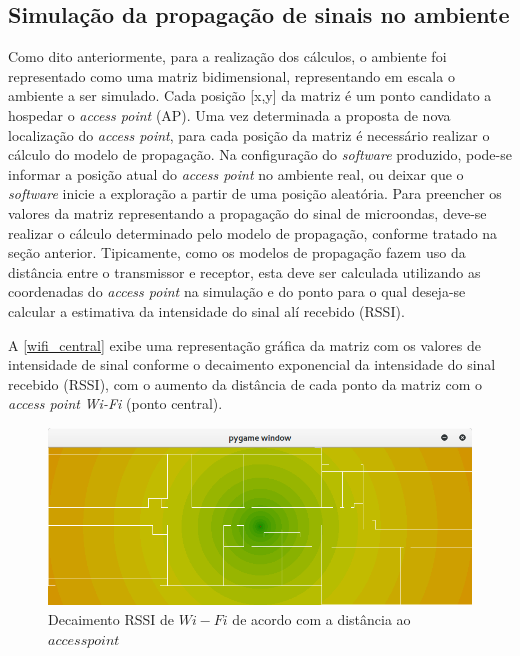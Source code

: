 \documentclass[
	12pt,				%
	twoside,			%
	a4paper,			%
	english,			%
	french,				%
	spanish,			%
	brazil				%
	]{abntex2}
\begin{document}
\subsection{Simulação da propagação de sinais no
ambiente}\label{simulauxe7uxe3o-da-propagauxe7uxe3o-de-sinais-no-ambiente}

Como dito anteriormente, para a realização dos cálculos, o ambiente foi
representado como uma matriz bidimensional, representando em escala o
ambiente a ser simulado. Cada posição {[}x,y{]} da matriz é um ponto
candidato a hospedar o \emph{access point} (AP). Uma vez determinada a
proposta de nova localização do \emph{access point}, para cada posição
da matriz é necessário realizar o cálculo do modelo de propagação. Na
configuração do \emph{software} produzido, pode-se informar a posição
atual do \emph{access point} no ambiente real, ou deixar que o
\emph{software} inicie a exploração a partir de uma posição aleatória.
Para preencher os valores da matriz representando a propagação do sinal
de microondas, deve-se realizar o cálculo determinado pelo modelo de
propagação, conforme tratado na seção anterior. Tipicamente, como os
modelos de propagação fazem uso da distância entre o transmissor e
receptor, esta deve ser calculada utilizando as coordenadas do
\emph{access point} na simulação e do ponto para o qual deseja-se
calcular a estimativa da intensidade do sinal alí recebido (RSSI).

A \autoref{wifi_central} exibe uma representação gráfica da matriz com
os valores de intensidade de sinal conforme o decaimento exponencial da
intensidade do sinal recebido (RSSI), com o aumento da distância de cada
ponto da matriz com o \emph{access point} \emph{Wi-Fi} (ponto central).

\begin{figure}[htb]
    \caption{\label{wifi_central} Decaimento RSSI de $Wi-Fi$ de acordo com a distância ao $access point$}
    \begin{center}
        \includegraphics[scale=0.5]{imagens/wifi-central.jpg}
    \end{center}
\end{figure}
\end{document}
